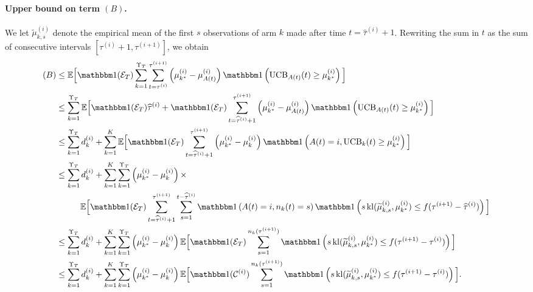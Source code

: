 \paragraph{Upper bound on term $(B)$.}
%
We let $\widetilde{\mu}_{k,s}^{(i)}$ denote the empirical mean of the first $s$ observations of arm $k$ made after time $t=\widehat{\tau}^{(i)}+1$.
Rewriting the sum in $t$ as the sum of consecutive intervals $[\tau^{(i)}+1, \tau^{(i+1)}]$, we obtain
%
\begin{align*}
    (B) & \leq \bE\Big[\indic(\cE_T)\sum_{k=1}^{\Upsilon_T} \sum_{t=\tau^{(i)}}^{\tau^{(i+1)}}\left(\mu_{k^*}^{(i)} - \mu_{A(t)}^{(i)}\right)\indic\left(\UCB_{A(t)}(t) \geq \mu_{k^*}^{(i)}\right)\Big] \\
    & \leq \sum_{k=1}^{\Upsilon_T}\bE\Big[\indic(\cE_T)\widehat{\tau}^{(i)} + \indic(\cE_T) \sum_{t=\widehat{\tau}^{(i)}+1}^{\tau^{(i+1)}}\left(\mu_{k^*}^{(i)} - \mu_{A(t)}^{(i)}\right)\indic\left(\UCB_{A(t)}(t) \geq \mu_{k^*}^{(i)}\right)\Big] \\
    & \leq \sum_{k=1}^{\Upsilon_T}d_k^{(i)}+ \sum_{k=1}^K \bE\Big[\indic(\cE_T) \sum_{t=\widehat{\tau}^{(i)}+1}^{\tau^{(i+1)}}\left(\mu_{k^*}^{(i)} - \mu_k^{(i)}\right)\indic\left(A(t)=i,\UCB_k(t) \geq \mu_{k^*}^{(i)}\right)\Big] \\
    & \leq \sum_{k=1}^{\Upsilon_T}d_k^{(i)}+ \sum_{k=1}^K \sum_{k=1}^{\Upsilon_T}\left(\mu_{k^*}^{(i)} - \mu_k^{(i)}\right)\times \\
    &\hspace{1cm}\bE\Big[\indic(\cE_T) \sum_{t=\widehat{\tau}^{(i)}+1}^{\tau^{(i+1)}}\sum_{s=1}^{t-\widehat{\tau}^{(i)}}\indic\left(A(t) = i,n_k(t) = s\right) \indic\left(s \, \kl(\widetilde{\mu}_{k,s}^{(i)}, \mu_{k^*}^{(i)}) \leq f(\tau^{(i+1)} - \widehat{\tau}^{(i)})\right)\Big]\\
    & \leq \sum_{k=1}^{\Upsilon_T}d_k^{(i)}+ \sum_{k=1}^K \sum_{k=1}^{\Upsilon_T}\left(\mu_{k^*}^{(i)} - \mu_k^{(i)}\right)\bE\Big[\indic(\cE_T) \sum_{s=1}^{n_k(\tau^{(i+1)})}\indic\left(s \, \kl(\widetilde{\mu}_{k,s}^{(i)}, \mu_{k^*}^{(i)}) \leq f(\tau^{(i+1)} - \tau^{(i)})\right)\Big]  \\
    & \leq \sum_{k=1}^{\Upsilon_T}d_k^{(i)}+ \sum_{k=1}^K \sum_{k=1}^{\Upsilon_T}\left(\mu_{k^*}^{(i)} - \mu_k^{(i)}\right)\bE\Big[\indic(\cC^{(i)}) \sum_{s=1}^{n_k(\tau^{(i+1)})}\indic\left(s \, \kl(\widetilde{\mu}_{k,s}^{(i)}, \mu_{k^*}^{(i)}) \leq f(\tau^{(i+1)} - \tau^{(i)})\right)\Big].
\end{align*}

